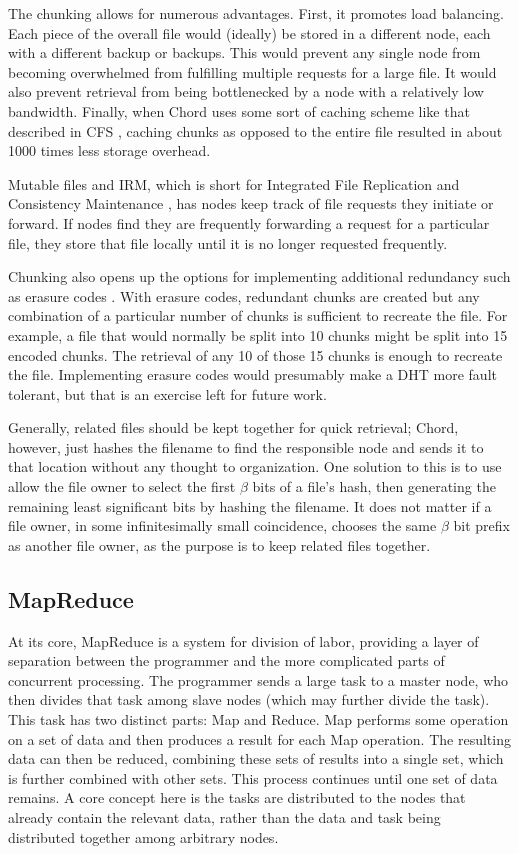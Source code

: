 The chunking allows for numerous advantages.  
First, it promotes load balancing. 
Each piece of the overall file would (ideally) be stored in a different node, each with a different backup or backups.  
This would prevent any single node from becoming overwhelmed from fulfilling multiple requests for a large file.  
It would also prevent retrieval from being bottlenecked by a node with a relatively low bandwidth. 
Finally, when Chord uses some sort of caching scheme like that described in CFS \cite{CFS}, caching chunks as opposed to the entire file resulted in about 1000 times less storage overhead.  

Mutable files and IRM, which is short for Integrated File Replication and Consistency Maintenance \cite{irm}, has nodes keep track of file requests they initiate or forward.  
If nodes find they are frequently forwarding a request for a particular file, they store that file locally until it is no longer requested frequently.  

Chunking also opens up the options for implementing additional redundancy such as erasure codes \cite{rizzo1997effective}. 
With erasure codes, redundant chunks are created but any combination of a particular number of chunks is sufficient to recreate the file.  
For example, a file that would normally be split into 10 chunks might be split into 15 encoded chunks.  The retrieval of any 10 of those 15 chunks is enough to recreate the file.  
Implementing erasure codes would presumably make a DHT more fault tolerant, but that is an exercise left for future work.


Generally, related files should be kept together for quick retrieval; Chord, however, just hashes the filename to find the responsible node and sends it to that location without any thought to organization.  
One solution to this is to use allow the file owner to select the first $ \beta $ bits of a file's hash, then generating the remaining least significant bits by hashing the filename.  
It does not matter if a file owner, in some infinitesimally small coincidence, chooses the same $ \beta $ bit prefix as another file owner, as the purpose is to keep related files together.   


\subsection{MapReduce}
At its core, MapReduce \cite{mapreduce} is a system for division of labor, providing a layer of separation between the programmer and the more complicated parts of concurrent processing.
The programmer sends a large task to a master node, who then divides that task among slave nodes (which may further divide the task).  This task has two distinct parts: Map and Reduce.  
Map performs some operation on a set of data and then produces a result for each Map operation.  
The resulting data can then be reduced, combining these sets of results into a single set, which is further combined with other sets.
This process continues until one set of data remains.
A core concept here is the tasks are distributed to the nodes that already contain the relevant data, rather than the data and task being distributed together among arbitrary nodes.

